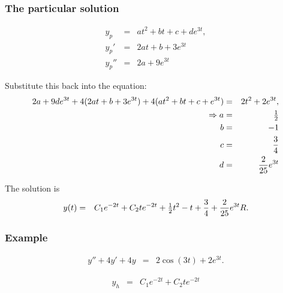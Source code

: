 \begin{frame}
  \frametitle{The particular solution}

  \begin{eqnarray*}
    y_p & = & at^2 + bt + c + d e^{3t}, \\
    y_p' & = & 2at + b + 3e^{3t} \\
    y_p'' & = & 2a + 9 e^{3t}
  \end{eqnarray*}

  Substitute this back into the equation:
  \begin{eqnarray*}
    2a + 9de^{3t} + 4 (2at+b + 3 e^{3t}) + 4 (at^2 + bt + c + e^{3t}) & = & 2t^2+2e^{3t}, \\
    \Rightarrow 
    a & = & \mbox{$\frac{1}{2}$} \\
    b & = & -1 \\
    c & = & \frac{3}{4} \\
    d & = & \frac{2}{25} e^{3t}
  \end{eqnarray*}

  The solution is 
  \begin{eqnarray*}
    y(t) & = & C_1 e^{-2t} + C_2 t e^{-2t} + \mbox{$\frac{1}{2}$} t^2 - t +
    \frac{3}{4} + \frac{2}{25} e^{3t}R.
  \end{eqnarray*}

\end{frame}



\begin{frame}
  \frametitle{Example}

  \begin{eqnarray*}
    y'' + 4y' + 4y & = & 2 \cos(3t) + 2e^{3t}.
  \end{eqnarray*}

  {
    \begin{eqnarray*}
      y_h & = & C_1 e^{-2t} + C_2 t e^{-2t}
    \end{eqnarray*}
  }

\end{frame}


